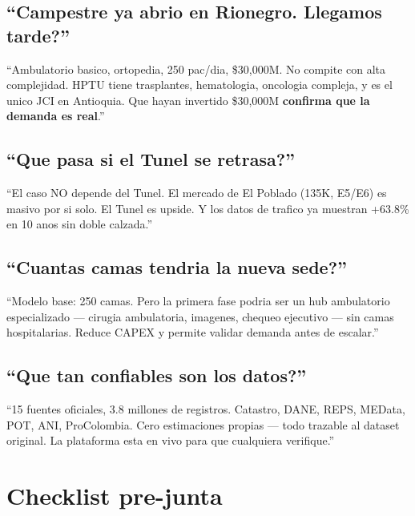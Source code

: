 \documentclass[10pt, a4paper]{article}
\begin{document}
\subsection{``Campestre ya abrio en Rionegro. Llegamos tarde?''}
\begin{tip}
``Ambulatorio basico, ortopedia, 250 pac/dia, \$30,000M. No compite con alta complejidad. HPTU tiene trasplantes, hematologia, oncologia compleja, y es el unico JCI en Antioquia. Que hayan invertido \$30,000M \textbf{confirma que la demanda es real}.''
\end{tip}

\subsection{``Que pasa si el Tunel se retrasa?''}
\begin{tip}
``El caso NO depende del Tunel. El mercado de El Poblado (135K, E5/E6) es masivo por si solo. El Tunel es upside. Y los datos de trafico ya muestran +63.8\% en 10 anos sin doble calzada.''
\end{tip}

\subsection{``Cuantas camas tendria la nueva sede?''}
\begin{tip}
``Modelo base: 250 camas. Pero la primera fase podria ser un hub ambulatorio especializado --- cirugia ambulatoria, imagenes, chequeo ejecutivo --- sin camas hospitalarias. Reduce CAPEX y permite validar demanda antes de escalar.''
\end{tip}

\subsection{``Que tan confiables son los datos?''}
\begin{tip}
``15 fuentes oficiales, 3.8 millones de registros. Catastro, DANE, REPS, MEData, POT, ANI, ProColombia. Cero estimaciones propias --- todo trazable al dataset original. La plataforma esta en vivo para que cualquiera verifique.''
\end{tip}

\section{Checklist pre-junta}
\end{document}
